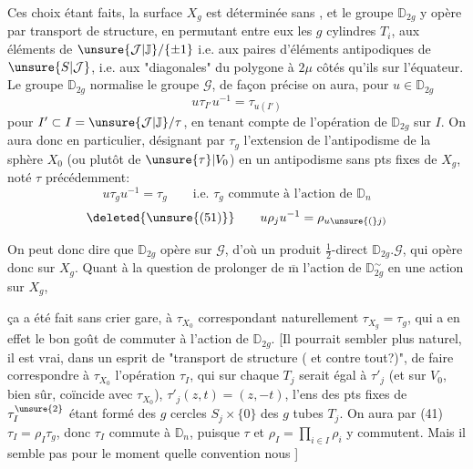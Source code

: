 Ces choix étant faits, la surface $X_g$ est déterminée sans
, et le groupe $\mathbb D_{2g}$ y opère par transport de
structure, en permutant entre eux les $g$ cylindres $T_i$,
 aux éléments de
$\unsure{\mathcal J|\mathbb J}/\{\pm1\}$ i.e.
aux paires d'éléments antipodiques de $\unsure{S|\mathcal J}$,
i.e. aux "diagonales" du polygone à $2\mu$ côtés
qu'ils 
sur l'équateur. Le groupe $\mathbb D_{2g}$ normalise
 le groupe $\mathcal G$, de façon précise
on aura, pour $u\in\mathbb D_{2g}$
\[
\tag{49}
u\tau_{I'}u^{-1}=\tau_{u(I')}
\]
pour $I'\subset I=\unsure{\mathcal J|\mathbb J}/\tau$, en tenant compte de
l'opération de $\mathbb D_{2g}$ sur $I$. On aura donc en
particulier, désignant par $\tau_g$\inserted{$=\tau_\varnothing$}
l'extension  de l'antipodisme de la sphère $X_0$
(ou plutôt de $\unsure{\tau}\vert V_0$) en un antipodisme
sans pts fixes de $X_g$, noté $\tau$ précédemment:
\[
\tag{50}
u\tau_g u^{-1}=\tau_g
\qquad\text{i.e. $\tau_g$ commute à l'action de $\mathbb D_n$}
\]
\[
\deleted{\unsure{(51)}}\qquad
u\rho_j u^{-1}=\rho_{u\unsure{(}j)}
\]

On peut donc dire que $\mathbb D_{2g}$ opère sur $\mathcal G$,
d'où un produit $\frac12$-direct $\mathbb D_{2g}.\mathcal G$,
qui opère donc sur $X_g$.
Quant à la question de prolonger de $\overline{\mathrm m}$
l'action  de $\mathbb D_{2g}^\sim$
  en une action sur $X_g$,



ça a été fait sans crier gare, à $\tau_{X_0}$ correspondant
naturellement $\tau_{X_g}=\tau_g$, qui a en effet le bon goût
de commuter à l'action de $\mathbb D_{2g}$.
[Il pourrait sembler plus naturel, il est vrai, dans un
esprit de "transport de structure ( et contre
tout?)", de faire correspondre à $\tau_{X_0}$ l'opération
$\tau_I$, qui sur
chaque $T_j$ serait égal à $\tau'_j$
(et sur $V_0$, bien sûr, coïncide avec $\tau_{X_0}$),
$\tau'_j(z,t)=(z,-t)$,
 l'ens des pts fixes de $\tau_I^{\unsure{2}}$
étant formé des $g$ cercles  $S_j\times\{0\}$
des $g$ tubes $T_j$. On aura par (41)
$\tau_I=\rho_I\tau_g$, donc $\tau_I$ commute
 à $\mathbb D_n$, puisque $\tau$ et
$\rho_I=\prod_{i\in I}\rho_i$ y commutent.
Mais il  semble pas  pour le moment
quelle convention nous ]


